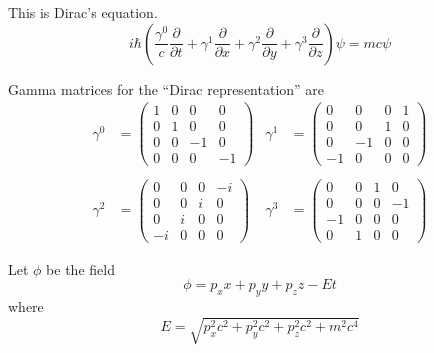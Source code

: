 \documentclass[12pt]{article}
\begin{document}
This is Dirac's equation.
\begin{equation*}
i\hbar\left(
\frac{\gamma^0}{c}\frac{\partial}{\partial t}+
\gamma^1\frac{\partial}{\partial x}+
\gamma^2\frac{\partial}{\partial y}+
\gamma^3\frac{\partial}{\partial z}
\right)\psi
=mc\psi
\end{equation*}

Gamma matrices for the ``Dirac representation'' are
\begin{align*}
\gamma^0&=\begin{pmatrix}1&0&0&0\\0&1&0&0\\0&0&-1&0\\0&0&0&-1\end{pmatrix}
& \gamma^1&=\begin{pmatrix}0&0&0&1\\0&0&1&0\\0&-1&0&0\\-1&0&0&0\end{pmatrix}
\\
\\
\gamma^2&=\begin{pmatrix}0&0&0&-i\\0&0&i&0\\0&i&0&0\\-i&0&0&0\end{pmatrix}
& \gamma^3&=\begin{pmatrix}0&0&1&0\\0&0&0&-1\\-1&0&0&0\\0&1&0&0\end{pmatrix}
\end{align*}

Let $\phi$ be the field
\begin{equation*}
\phi=p_xx+p_yy+p_zz-Et
\end{equation*}
where
\begin{equation*}
E=\sqrt{p_x^2c^2+p_y^2c^2+p_z^2c^2+m^2c^4}
\end{equation*}
\end{document}
